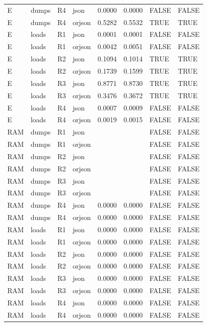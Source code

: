 \begin{table}[ht]
\begin{tabular}{llllrrll}
  E & dumps & R4 & json & 0.0000 & 0.0000 & FALSE & FALSE \\ 
  E & dumps & R4 & orjson & 0.5282 & 0.5532 & TRUE & TRUE \\ 
  E & loads & R1 & json & 0.0001 & 0.0001 & FALSE & FALSE \\ 
  E & loads & R1 & orjson & 0.0042 & 0.0051 & FALSE & FALSE \\ 
  E & loads & R2 & json & 0.1094 & 0.1014 & TRUE & TRUE \\ 
  E & loads & R2 & orjson & 0.1739 & 0.1599 & TRUE & TRUE \\ 
  E & loads & R3 & json & 0.8771 & 0.8730 & TRUE & TRUE \\ 
  E & loads & R3 & orjson & 0.3476 & 0.3672 & TRUE & TRUE \\ 
  E & loads & R4 & json & 0.0007 & 0.0009 & FALSE & FALSE \\ 
  E & loads & R4 & orjson & 0.0019 & 0.0015 & FALSE & FALSE \\ 
  RAM & dumps & R1 & json &  &  & FALSE & FALSE \\ 
  RAM & dumps & R1 & orjson &  &  & FALSE & FALSE \\ 
  RAM & dumps & R2 & json &  &  & FALSE & FALSE \\ 
  RAM & dumps & R2 & orjson &  &  & FALSE & FALSE \\ 
  RAM & dumps & R3 & json &  &  & FALSE & FALSE \\ 
  RAM & dumps & R3 & orjson &  &  & FALSE & FALSE \\ 
  RAM & dumps & R4 & json & 0.0000 & 0.0000 & FALSE & FALSE \\ 
  RAM & dumps & R4 & orjson & 0.0000 & 0.0000 & FALSE & FALSE \\ 
  RAM & loads & R1 & json & 0.0000 & 0.0000 & FALSE & FALSE \\ 
  RAM & loads & R1 & orjson & 0.0000 & 0.0000 & FALSE & FALSE \\ 
  RAM & loads & R2 & json & 0.0000 & 0.0000 & FALSE & FALSE \\ 
  RAM & loads & R2 & orjson & 0.0000 & 0.0000 & FALSE & FALSE \\ 
  RAM & loads & R3 & json & 0.0000 & 0.0000 & FALSE & FALSE \\ 
  RAM & loads & R3 & orjson & 0.0000 & 0.0000 & FALSE & FALSE \\ 
  RAM & loads & R4 & json & 0.0000 & 0.0000 & FALSE & FALSE \\ 
  RAM & loads & R4 & orjson & 0.0000 & 0.0000 & FALSE & FALSE \\ 

\end{tabular}
\end{table}
